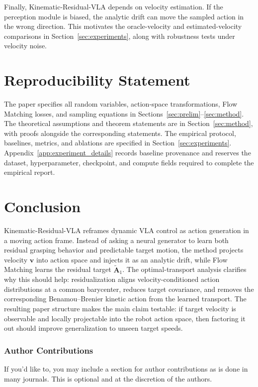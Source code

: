 \documentclass[10pt,twocolumn,letterpaper]{article}
\newcommand{\vect}[1]{\boldsymbol{#1}}
\begin{document}
Finally, Kinematic-Residual-VLA depends on velocity estimation. If the perception module is biased, the analytic drift can move the sampled action in the wrong direction. This motivates the oracle-velocity and estimated-velocity comparisons in Section~\ref{sec:experiments}, along with robustness tests under velocity noise.

\section{Reproducibility Statement}
\label{sec:reproducibility}

The paper specifies all random variables, action-space transformations, Flow Matching losses, and sampling equations in Sections~\ref{sec:prelim}--\ref{sec:method}. The theoretical assumptions and theorem statements are in Section~\ref{sec:method}, with proofs alongside the corresponding statements. The empirical protocol, baselines, metrics, and ablations are specified in Section~\ref{sec:experiments}. Appendix~\ref{app:experiment_details} records baseline provenance and reserves the dataset, hyperparameter, checkpoint, and compute fields required to complete the empirical report.

\section{Conclusion}
\label{sec:conclusion}

Kinematic-Residual-VLA reframes dynamic VLA control as action generation in a moving action frame. Instead of asking a neural generator to learn both residual grasping behavior and predictable target motion, the method projects velocity $\vect v$ into action space and injects it as an analytic drift, while Flow Matching learns the residual target $\widetilde{\vect A}_1$. The optimal-transport analysis clarifies why this should help: residualization aligns velocity-conditioned action distributions at a common barycenter, reduces target covariance, and removes the corresponding Benamou--Brenier kinetic action from the learned transport. The resulting paper structure makes the main claim testable: if target velocity is observable and locally projectable into the robot action space, then factoring it out should improve generalization to unseen target speeds.

\subsubsection*{Author Contributions}
If you'd like to, you may include  a section for author contributions as is done
in many journals. This is optional and at the discretion of the authors.
\end{document}
